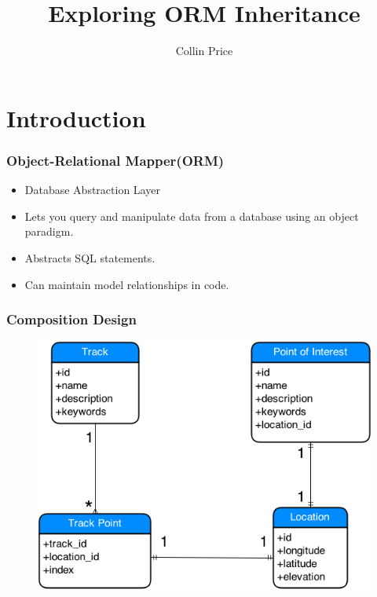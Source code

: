 \documentclass{beamer}
\title[ORM Inheritance]{Exploring ORM Inheritance}
\author{Collin Price}
\begin{document}
\begin{frame}
	\titlepage
\end{frame}

\section{Introduction}

\begin{frame}
	\frametitle{Object-Relational Mapper(ORM)}
	\begin{itemize}
		\item Database Abstraction Layer
		\item Lets you query and manipulate data from a database using an object paradigm.\
		\item Abstracts SQL statements.
		\item Can maintain model relationships in code.
	\end{itemize}
\end{frame}

\begin{frame}
	\frametitle{Composition Design}
	\begin{figure}
		\centering
		\includegraphics[scale=0.4]{resources/verbose-gps.png}
	\end{figure}
\end{frame}
\end{document}

